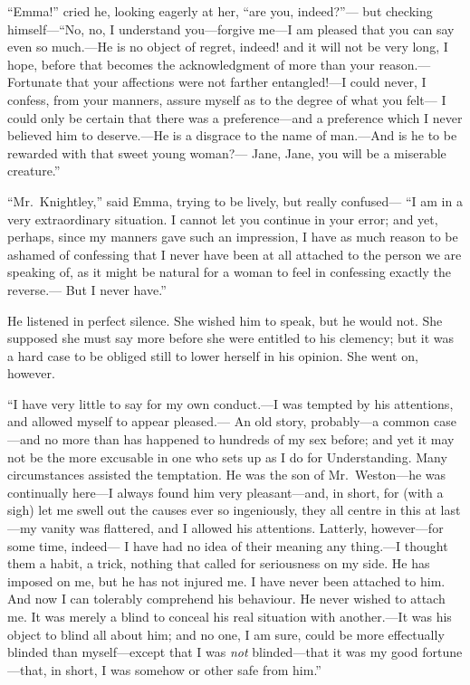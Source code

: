 ``Emma!'' cried he, looking eagerly at her, ``are you, indeed?''---%
but checking himself---``No, no, I understand you---forgive me---I am
pleased that you can say even so much.---He is no object of regret,
indeed! and it will not be very long, I hope, before that becomes
the acknowledgment of more than your reason.---Fortunate that your
affections were not farther entangled!---I could never, I confess,
from your manners, assure myself as to the degree of what you felt---%
I could only be certain that there was a preference---and a preference
which I never believed him to deserve.---He is a disgrace to the name
of man.---And is he to be rewarded with that sweet young woman?---%
Jane, Jane, you will be a miserable creature.''

``Mr.\ Knightley,'' said Emma, trying to be lively, but really confused---%
``I am in a very extraordinary situation.  I cannot let you continue in
your error; and yet, perhaps, since my manners gave such an impression,
I have as much reason to be ashamed of confessing that I never have
been at all attached to the person we are speaking of, as it might
be natural for a woman to feel in confessing exactly the reverse.---%
But I never have.''

He listened in perfect silence.  She wished him to speak, but he
would not.  She supposed she must say more before she were entitled
to his clemency; but it was a hard case to be obliged still to lower
herself in his opinion.  She went on, however.

``I have very little to say for my own conduct.---I was tempted
by his attentions, and allowed myself to appear pleased.---%
An old story, probably---a common case---and no more than has happened
to hundreds of my sex before; and yet it may not be the more excusable
in one who sets up as I do for Understanding.  Many circumstances
assisted the temptation.  He was the son of Mr.\ Weston---he was
continually here---I always found him very pleasant---and, in short,
for (with a sigh) let me swell out the causes ever so ingeniously,
they all centre in this at last---my vanity was flattered, and I
allowed his attentions.  Latterly, however---for some time, indeed---%
I have had no idea of their meaning any thing.---I thought them
a habit, a trick, nothing that called for seriousness on my side.
He has imposed on me, but he has not injured me.  I have never been
attached to him.  And now I can tolerably comprehend his behaviour.
He never wished to attach me.  It was merely a blind to conceal
his real situation with another.---It was his object to blind
all about him; and no one, I am sure, could be more effectually
blinded than myself---except that I was \emph{not} blinded---that it was my
good fortune---that, in short, I was somehow or other safe from him.''

